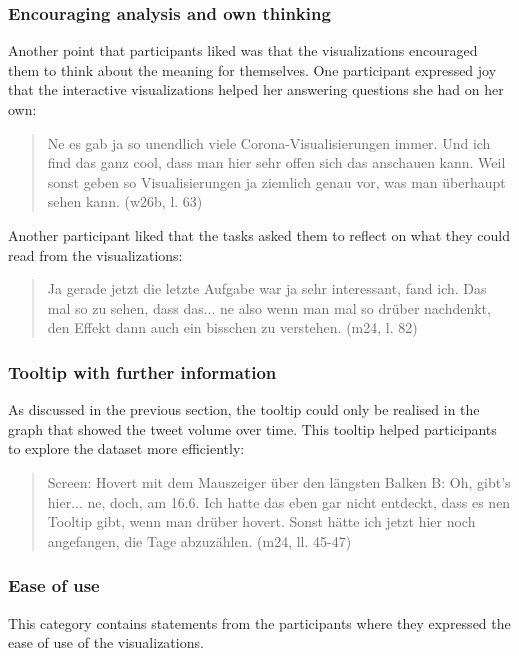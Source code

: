 \subsubsection*{Encouraging analysis and own thinking}
Another point that participants liked was that the visualizations encouraged them to think about the meaning for themselves. One participant expressed joy that the interactive visualizations helped her answering questions she had on her own:

\begin{quote}
    Ne es gab ja so unendlich viele Corona-Visualisierungen immer. Und ich find das ganz cool, dass man hier sehr offen sich das anschauen kann. Weil sonst geben so Visualisierungen ja ziemlich genau vor, was man überhaupt sehen kann. (w26b, l. 63)
\end{quote}

Another participant liked that the tasks asked them to reflect on what they could read from the visualizations:

\begin{quote}
    Ja gerade jetzt die letzte Aufgabe war ja sehr interessant, fand ich. Das mal so zu sehen, dass das... ne also wenn man mal so drüber nachdenkt, den Effekt dann auch ein bisschen zu verstehen. (m24, l. 82)
\end{quote}

\subsubsection*{Tooltip with further information}
As discussed in the previous section, the tooltip could only be realised in the graph that showed the tweet volume over time. This tooltip helped participants to explore the dataset more efficiently:

\begin{quote}
    Screen: Hovert mit dem Mauszeiger über den längsten Balken
    B: Oh, gibt's hier... ne, doch, am 16.6. Ich hatte das eben gar nicht entdeckt, dass es nen Tooltip gibt, wenn man drüber hovert. Sonst hätte ich jetzt hier noch angefangen, die Tage abzuzählen. (m24, ll. 45-47)
\end{quote}

\subsubsection*{Ease of use}
This category contains statements from the participants where they expressed the ease of use of the visualizations.

